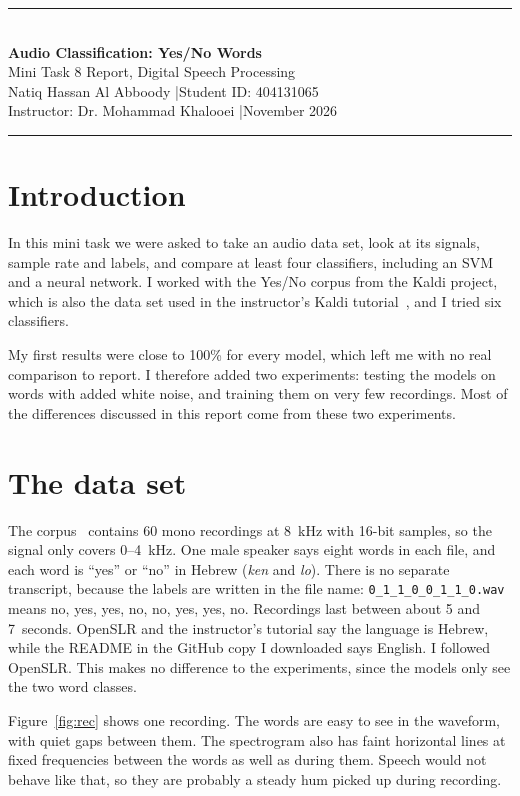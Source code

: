 \documentclass[11pt,a4paper]{article}
\begin{document}
\begin{center}
{\color{navy}\rule{\textwidth}{1.2pt}}\\[6pt]
{\LARGE\bfseries\color{navy} Audio Classification: Yes/No Words}\\[4pt]
{\large Mini Task 8 Report, Digital Speech Processing}\\[6pt]
Natiq Hassan Al Abboody \quad|\quad Student ID: 404131065\\
Instructor: Dr. Mohammad Khalooei \quad|\quad November 2026\\[2pt]
{\color{gold}\rule{\textwidth}{0.8pt}}
\end{center}

\section{Introduction}
In this mini task we were asked to take an audio data set, look at its signals, sample rate and labels, and compare at least four classifiers, including an SVM and a neural network. I worked with the Yes/No corpus from the Kaldi project, which is also the data set used in the instructor's Kaldi tutorial~\cite{khalooei}, and I tried six classifiers.

My first results were close to 100\% for every model, which left me with no real comparison to report. I therefore added two experiments: testing the models on words with added white noise, and training them on very few recordings. Most of the differences discussed in this report come from these two experiments.

\section{The data set}
The corpus~\cite{openslr} contains 60 mono recordings at 8~kHz with 16-bit samples, so the signal only covers 0--4~kHz. One male speaker says eight words in each file, and each word is ``yes'' or ``no'' in Hebrew (\emph{ken} and \emph{lo}). There is no separate transcript, because the labels are written in the file name: \texttt{0\_1\_1\_0\_0\_1\_1\_0.wav} means no, yes, yes, no, no, yes, yes, no. Recordings last between about 5 and 7~seconds. OpenSLR and the instructor's tutorial say the language is Hebrew, while the README in the GitHub copy I downloaded says English. I followed OpenSLR. This makes no difference to the experiments, since the models only see the two word classes.

Figure~\ref{fig:rec} shows one recording. The words are easy to see in the waveform, with quiet gaps between them. The spectrogram also has faint horizontal lines at fixed frequencies between the words as well as during them. Speech would not behave like that, so they are probably a steady hum picked up during recording.
\end{document}
